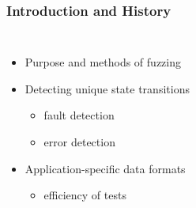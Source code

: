 \begin{frame}
\frametitle{Introduction and History}
\begin{columns}
\begin{itemize}
\item{Purpose and methods of fuzzing}
\item{Detecting unique state transitions}
\begin{itemize}
\item{fault detection}
\item{error detection}
\end{itemize}
\item{Application-specific data formats}
\begin{itemize}
\item{efficiency of tests}
\end{itemize}
\end{itemize}
\begin{figure}
\end{figure}
\end{columns}
\end{frame}
